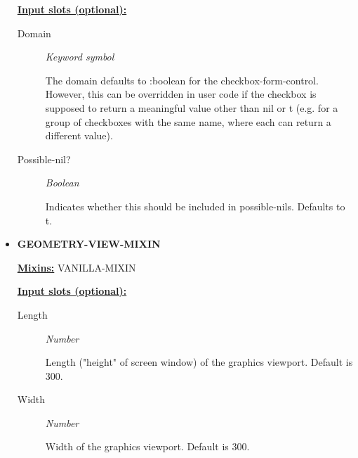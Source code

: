 \documentclass [11pt]{book}
\begin{document}
\begin{itemize}
\textbf{
\underline{Input slots (optional):}}

\begin{description}

\item [Domain]
\emph{Keyword symbol}

 The domain defaults to :boolean for the checkbox-form-control.
However, this can be overridden in user code if the checkbox is supposed to return
a meaningful value other than nil or t (e.g. for a group of checkboxes with
the same name, where each can return a different value).




\item [Possible-nil?]
\emph{Boolean}

 Indicates whether this should be included in possible-nils. Defaults to t.




\end{description}







\item {}
\textbf{GEOMETRY-VIEW-MIXIN}


\textbf{
\underline{Mixins:}} VANILLA-MIXIN





\begin{description}

\end{description}








\textbf{
\underline{Input slots (optional):}}

\begin{description}

\item [Length]
\emph{Number}

 Length ("height" of screen window) of the graphics viewport. Default is 300.




\item [Width]
\emph{Number}

 Width of the graphics viewport. Default is 300.





\end{description}
\end{itemize}
\end{document}

